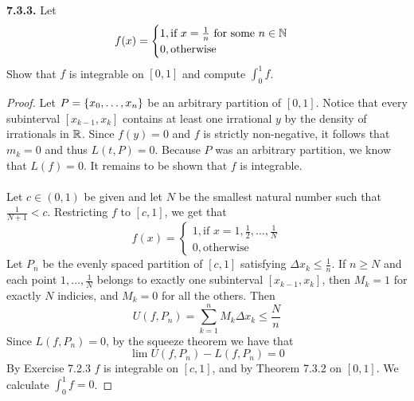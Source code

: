 \documentclass{exam}
\begin{document}
\newpage
\textbf{7.3.3. } 
Let 
$$f(x) = \begin{cases}
    1, \text{if } x = \frac{1}{n}\text{ for some }n\in \mathbb {N} \\
    0, \text{otherwise}
\end{cases}$$
Show that $f$ is integrable on $[0, 1]$ and compute $\int_0^1 f$.
\begin{proof}
    Let $P = \left \{ x_0, \hdots, x_n \right \}$ be an arbitrary partition of $[0, 1]$. Notice that every subinterval $[x_{k - 1}, x_k]$ contains at least one irrational $y$ by the density of irrationals in $\mathbb {R}$. Since $f(y) = 0$ and $f$ is strictly non-negative, it follows that $m_k = 0$ and thus $L(t, P) = 0$. Because $P$ was an arbitrary partition, we know that $L(f) = 0$. It remains to be shown that $f$ is integrable.\\\\

    Let $c\in (0, 1)$ be given and let $N$ be the smallest natural number such that $\frac{1}{N + 1} < c$. Restricting $f$ to $[c, 1]$, we get that
    $$f(x) = \begin{cases}
        1, \text{if } x = 1, \frac{1}{2}, \hdots, \frac{1}{N}\\
        0, \text{otherwise}
    \end{cases}$$
    Let $P_n$ be the evenly spaced partition of $[c, 1]$ satisfying $\Delta x_k \leq \frac{1}{n}$. If $n \geq N$ and each point $1, \hdots, \frac{1}{N}$ belongs to exactly one subinterval $[x_{k - 1}, x_k]$, then $M_k = 1$ for exactly $N$ indicies, and $M_k = 0$ for all the others. Then
    $$U(f, P_n) = \sum_{k = 1}^n M_k\Delta x_k \leq \frac{N}{n}$$
    Since $L(f, P_n) = 0$, by the squeeze theorem we have that
    $$\lim U(f, P_n) - L(f, P_n) = 0$$
    By Exercise 7.2.3 $f$ is integrable on $[c, 1]$, and by Theorem 7.3.2 on $[0, 1]$. We calculate $\int_0^1 f = 0$.
\end{proof}
\end{document}
